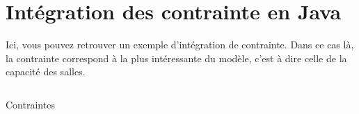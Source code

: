 \documentclass[
    reds, %
    il, %
]{heig-tb}
\let\cleardoublepage=\clearpage
\begin{document}
\chapter{Intégration des contrainte en Java}
Ici, vous pouvez retrouver un exemple d'intégration de contrainte. Dans ce cas là, la contrainte correspond à la plus intéressante du modèle, c'est à dire celle de la capacité des salles.

\begin{listing}[H]
    \inputminted[breaklines]{java}{assets/figures/contraintes.java}
    \caption{Contraintes}
\end{listing}

\let\cleardoublepage\clearpage
\backmatter

\label{glossaire}
\printnoidxglossary
\label{index}
\printindex
\end{document}
